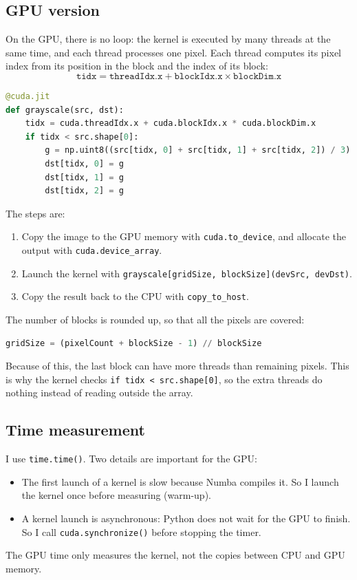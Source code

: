 \documentclass[11pt,a4paper]{article}
\begin{document}
\subsection{GPU version}
On the GPU, there is no loop: the kernel is executed by many threads at the same time, and
each thread processes one pixel. Each thread computes its pixel index from its position in
the block and the index of its block:
\[
\texttt{tidx} = \texttt{threadIdx.x} + \texttt{blockIdx.x} \times \texttt{blockDim.x}
\]

\begin{lstlisting}[language=Python]
@cuda.jit
def grayscale(src, dst):
    tidx = cuda.threadIdx.x + cuda.blockIdx.x * cuda.blockDim.x
    if tidx < src.shape[0]:
        g = np.uint8((src[tidx, 0] + src[tidx, 1] + src[tidx, 2]) / 3)
        dst[tidx, 0] = g
        dst[tidx, 1] = g
        dst[tidx, 2] = g
\end{lstlisting}

The steps are:
\begin{enumerate}
  \item Copy the image to the GPU memory with \texttt{cuda.to\_device}, and allocate the
        output with \texttt{cuda.device\_array}.
  \item Launch the kernel with \texttt{grayscale[gridSize, blockSize](devSrc, devDst)}.
  \item Copy the result back to the CPU with \texttt{copy\_to\_host}.
\end{enumerate}

The number of blocks is rounded up, so that all the pixels are covered:
\begin{lstlisting}[language=Python]
gridSize = (pixelCount + blockSize - 1) // blockSize
\end{lstlisting}
Because of this, the last block can have more threads than remaining pixels. This is why
the kernel checks \texttt{if tidx < src.shape[0]}, so the extra threads do nothing instead
of reading outside the array.

\subsection{Time measurement}
I use \texttt{time.time()}. Two details are important for the GPU:
\begin{itemize}
  \item The first launch of a kernel is slow because Numba compiles it. So I launch the
        kernel once before measuring (warm-up).
  \item A kernel launch is asynchronous: Python does not wait for the GPU to finish. So I
        call \texttt{cuda.synchronize()} before stopping the timer.
\end{itemize}
The GPU time only measures the kernel, not the copies between CPU and GPU memory.
\end{document}
